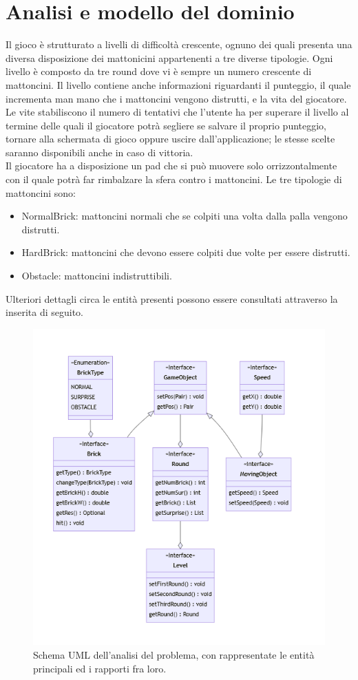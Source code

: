\documentclass[a4paper,12pt]{report}
\begin{document}
\section{Analisi e modello del dominio}
Il gioco è strutturato a livelli di difficoltà crescente, ognuno dei quali presenta una diversa disposizione dei mattonicini appartenenti a tre diverse tipologie. Ogni livello è composto da tre round dove vi è sempre un numero crescente di mattoncini.
Il livello contiene anche informazioni riguardanti il punteggio, il quale incrementa man mano che i mattoncini vengono distrutti, e la vita del giocatore.
\\Le vite stabiliscono il numero di tentativi che l'utente ha per superare il livello al termine delle quali il giocatore potrà segliere se salvare il proprio punteggio, tornare alla schermata di gioco oppure uscire dall'applicazione; le stesse scelte saranno disponibili anche in caso di vittoria.
\\Il giocatore ha a disposizione un pad che si può muovere solo orrizzontalmente con il quale potrà far rimbalzare la sfera contro i mattoncini.
Le tre tipologie di mattoncini sono:
\begin{itemize}
    \item NormalBrick: mattoncini normali che se colpiti una volta dalla palla vengono distrutti.
    \item HardBrick: mattoncini che devono essere colpiti due volte per essere distrutti.
    \item Obstacle: mattoncini indistruttibili.
\end{itemize}
Ulteriori dettagli circa le entità presenti possono essere consultati attraverso la  inserita di seguito.
\begin{figure}[H]
    \centering{}
    \includegraphics[scale=0.8]{images/analysis.png}
    \caption{Schema UML dell'analisi del problema, con rappresentate le entità principali ed i rapporti fra loro.}
    \label{images:analysis}
\end{figure}
\end{document}
